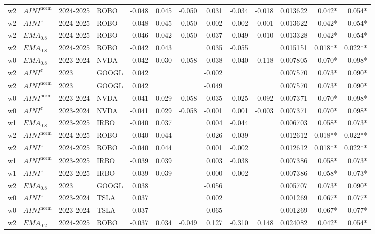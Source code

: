 \begin{longtable}{@{}llllrrrrrrrrr@{}}
w2 & $AINI^{\mathrm{norm}}$ & 2024-2025 & ROBO & -0.048 & 0.045 & -0.050 & 0.031 & -0.034 & -0.018 & 0.013622 & 0.042* & 0.054* \\
w2 & $AINI^{z}$ & 2024-2025 & ROBO & -0.048 & 0.045 & -0.050 & 0.002 & -0.002 & -0.001 & 0.013622 & 0.042* & 0.054* \\
w2 & $EMA_{0.8}$ & 2024-2025 & ROBO & -0.046 & 0.042 & -0.050 & 0.037 & -0.049 & -0.010 & 0.013328 & 0.042* & 0.054* \\
w2 & $EMA_{0.8}$ & 2024-2025 & ROBO & -0.042 & 0.043 &  & 0.035 & -0.055 &  & 0.015151 & 0.018** & 0.022** \\
w0 & $EMA_{0.8}$ & 2023-2024 & NVDA & -0.042 & 0.030 & -0.058 & -0.038 & 0.040 & -0.118 & 0.007805 & 0.070* & 0.098* \\
w2 & $AINI^{z}$ & 2023 & GOOGL & 0.042 &  &  & -0.002 &  &  & 0.007570 & 0.073* & 0.090* \\
w2 & $AINI^{\mathrm{norm}}$ & 2023 & GOOGL & 0.042 &  &  & -0.049 &  &  & 0.007570 & 0.073* & 0.090* \\
w0 & $AINI^{\mathrm{norm}}$ & 2023-2024 & NVDA & -0.041 & 0.029 & -0.058 & -0.035 & 0.025 & -0.092 & 0.007371 & 0.070* & 0.098* \\
w0 & $AINI^{z}$ & 2023-2024 & NVDA & -0.041 & 0.029 & -0.058 & -0.001 & 0.001 & -0.003 & 0.007371 & 0.070* & 0.098* \\
w1 & $EMA_{0.8}$ & 2023-2025 & IRBO & -0.040 & 0.037 &  & 0.004 & -0.044 &  & 0.006703 & 0.058* & 0.073* \\
w2 & $AINI^{\mathrm{norm}}$ & 2024-2025 & ROBO & -0.040 & 0.044 &  & 0.026 & -0.039 &  & 0.012612 & 0.018** & 0.022** \\
w2 & $AINI^{z}$ & 2024-2025 & ROBO & -0.040 & 0.044 &  & 0.001 & -0.002 &  & 0.012612 & 0.018** & 0.022** \\
w1 & $AINI^{\mathrm{norm}}$ & 2023-2025 & IRBO & -0.039 & 0.039 &  & 0.003 & -0.038 &  & 0.007386 & 0.058* & 0.073* \\
w1 & $AINI^{z}$ & 2023-2025 & IRBO & -0.039 & 0.039 &  & 0.000 & -0.002 &  & 0.007386 & 0.058* & 0.073* \\
w2 & $EMA_{0.8}$ & 2023 & GOOGL & 0.038 &  &  & -0.056 &  &  & 0.005707 & 0.073* & 0.090* \\
w0 & $AINI^{z}$ & 2023-2024 & TSLA & 0.037 &  &  & 0.002 &  &  & 0.001269 & 0.067* & 0.077* \\
w0 & $AINI^{\mathrm{norm}}$ & 2023-2024 & TSLA & 0.037 &  &  & 0.065 &  &  & 0.001269 & 0.067* & 0.077* \\
w2 & $EMA_{0.2}$ & 2024-2025 & ROBO & -0.037 & 0.034 & -0.049 & 0.127 & -0.310 & 0.148 & 0.024082 & 0.042* & 0.054* \\

\end{longtable}
